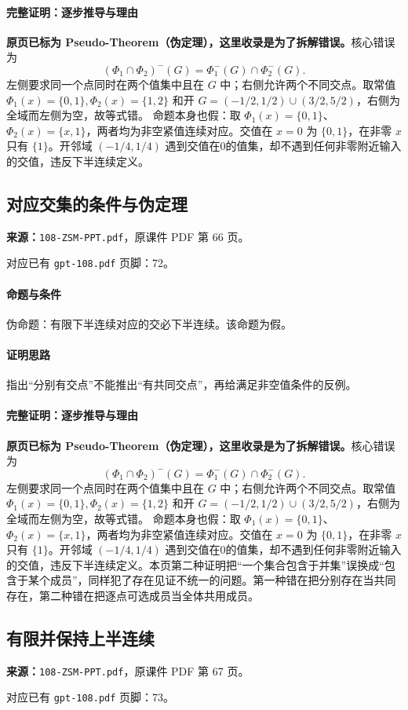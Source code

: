 \paragraph{完整证明：逐步推导与理由}
\textbf{原页已标为 Pseudo-Theorem（伪定理），这里收录是为了拆解错误。}核心错误为
\[(\Phi_1\cap\Phi_2)^-(G)=\Phi_1^-(G)\cap\Phi_2^-(G).\]
左侧要求同一个点同时在两个值集中且在 $G$ 中；右侧允许两个不同交点。取常值 $\Phi_1(x)=\{0,1\},\Phi_2(x)=\{1,2\}$ 和开 $G=(-1/2,1/2)\cup(3/2,5/2)$，右侧为全域而左侧为空，故等式错。
命题本身也假：取 $\Phi_1(x)=\{0,1\}$、$\Phi_2(x)=\{x,1\}$，两者均为非空紧值连续对应。交值在 $x=0$ 为 $\{0,1\}$，在非零 $x$ 只有 $\{1\}$。开邻域 $(-1/4,1/4)$ 遇到交值在0的值集，却不遇到任何非零附近输入的交值，违反下半连续定义。
\clearpage\subsection{对应交集的条件与伪定理}
\textbf{来源：}\texttt{108-ZSM-PPT.pdf}，原课件 PDF 第 66 页。\par
对应已有 \texttt{gpt-108.pdf} 页脚：72。\par
\paragraph{命题与条件}伪命题：有限下半连续对应的交必下半连续。该命题为假。
\paragraph{证明思路}指出“分别有交点”不能推出“有共同交点”，再给满足非空值条件的反例。
\paragraph{完整证明：逐步推导与理由}
\textbf{原页已标为 Pseudo-Theorem（伪定理），这里收录是为了拆解错误。}核心错误为
\[(\Phi_1\cap\Phi_2)^-(G)=\Phi_1^-(G)\cap\Phi_2^-(G).\]
左侧要求同一个点同时在两个值集中且在 $G$ 中；右侧允许两个不同交点。取常值 $\Phi_1(x)=\{0,1\},\Phi_2(x)=\{1,2\}$ 和开 $G=(-1/2,1/2)\cup(3/2,5/2)$，右侧为全域而左侧为空，故等式错。
命题本身也假：取 $\Phi_1(x)=\{0,1\}$、$\Phi_2(x)=\{x,1\}$，两者均为非空紧值连续对应。交值在 $x=0$ 为 $\{0,1\}$，在非零 $x$ 只有 $\{1\}$。开邻域 $(-1/4,1/4)$ 遇到交值在0的值集，却不遇到任何非零附近输入的交值，违反下半连续定义。本页第二种证明把“一个集合包含于并集”误换成“包含于某个成员”，同样犯了存在见证不统一的问题。第一种错在把分别存在当共同存在，第二种错在把逐点可选成员当全体共用成员。
\clearpage\subsection{有限并保持上半连续}
\textbf{来源：}\texttt{108-ZSM-PPT.pdf}，原课件 PDF 第 67 页。\par
对应已有 \texttt{gpt-108.pdf} 页脚：73。\par
